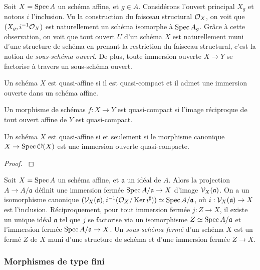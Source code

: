 Soit $X=\operatorname{Spec} A$ un schéma affine, et $g\in A$. Considérons l'ouvert principal $X_g$ et notons $i$ l'inclusion. Vu la construction du faisceau structural $\mathcal{O}_X$, on voit que $(X_g, i^{-1}\mathcal{O}_X)$ est naturellement un schéma isomorphe à $\operatorname{Spec} A_g$. Grâce à cette observation, on voit que tout ouvert $U$ d'un schéma $X$ est naturellement muni d'une structure de schéma en prenant la restriction du faisceau structural, c'est la notion de \textit{sous-schéma ouvert}. De plus, toute immersion ouverte $X\rightarrow Y$ se factorise à travers un sous-schéma ouvert.

\begin{defn}
Un schéma $X$ est quasi-affine si il est quasi-compact et il admet une immersion ouverte dans un schéma affine.
\end{defn}

\begin{defn}
Un morphisme de schémas $f:X\rightarrow Y$ est quasi-compact si l'image réciproque de tout ouvert affine de $Y$ est quasi-compact. 
\end{defn}

\begin{prop}\label{QuasiAffCritere}
Un schéma $X$ est quasi-affine si et seulement si le morphisme canonique $X\rightarrow \operatorname{Spec} \mathcal{O}(X)$ est une immersion ouverte quasi-compacte.
\end{prop}
\begin{proof}
\cite[\href{http://stacks.math.columbia.edu/tag/01P9}{Lemma 01P9}]{stacks-project}
\end{proof}


Soit $X=\operatorname{Spec} A$ un schéma affine, et $\mathfrak{a}$ un idéal de $A$. Alors la projection $A\rightarrow A/\mathfrak{a}$ définit une immersion fermée $\operatorname{Spec} A/\mathfrak{a}\rightarrow X$ d'image $\mathcal{V}_X(\mathfrak{a})$. On a un isomorphisme canonique $(\mathcal{V}_X(\mathfrak{a}), i^{-1}(\mathcal{O}_X/\operatorname{Ker} i^\sharp))\simeq \operatorname{Spec} A/\mathfrak{a}$, où $i:\mathcal{V}_X(\mathfrak{a})\rightarrow X$ est l'inclusion. Réciproquement, pour tout immersion fermée $j:Z\rightarrow X$, il existe un unique idéal $\mathfrak{a}$ tel que $j$ se factorise via un isomorphisme $Z\simeq \operatorname{Spec} A/\mathfrak{a}$ et l'immersion fermée $\operatorname{Spec} A/\mathfrak{a}\rightarrow X$. Un \textit{sous-schéma fermé} d'un schéma $X$ est un fermé $Z$ de $X$ muni d'une structure de schéma et d'une immersion fermée $Z\rightarrow X$. 

\subsubsection{Morphismes de type fini}

